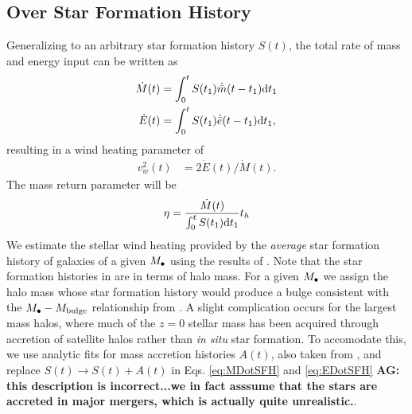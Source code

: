 \subsection{Over Star Formation History}
Generalizing to an arbitrary star formation history $S(t)$, the total rate of mass and energy input can be written as
\begin{align} 
  \dot{M}(t) &= \int_0^t S(t_1) \dot{\bar{m}}(t-t_1){\rm
      d}t_1 \label{eq:MDotSFH}\\
  \dot{E}(t) &= \int_0^t S(t_1) \dot{\bar{e}}(t-t_1){\rm
      d}t_1, \label{eq:EDotSFH}
\end{align}
resulting in a wind heating parameter of 
\begin{align}
  v_w^2(t) &=2 \dot{E}(t)/\dot{M}(t).
\end{align}
The mass return parameter will be
\begin{align}
\eta = \frac{\dot{M}(t)}{\int_0^t S(t_1) {\rm d}t_1} t_h
\end{align}
We estimate the stellar wind heating provided by the {\it average}
star formation history of galaxies of a given $M_{\bullet}$ using the results
of \citet[eqs.~17-20]{MosterNaab+:2013a}.  Note that the
star formation histories in \citet{MosterNaab+:2013a} are in terms of
halo mass. For a given $M_{\bullet}$ we assign the halo mass whose star
formation history would produce a bulge consistent with the
$M_{\bullet}-M_{\rm bulge}$ relationship from \citet{McConnellMa:2013a}.  A
slight complication occurs for the largest mass halos, where much of
the $z=0$ stellar mass has been acquired through accretion of
satellite halos rather than {\it in situ} star formation.  To
accomodate this, we use analytic fits for mass accretion histories
$A(t)$, also taken from \citet[eqs.~21-23]{MosterNaab+:2013a}, and
replace $S(t) \rightarrow S(t)+A(t)$ in Eqs. \ref{eq:MDotSFH} and
\ref{eq:EDotSFH} {\bf AG: this description is incorrect...we in fact
  asssume that the stars are accreted in major mergers, which is
  actually quite unrealistic.}. 

